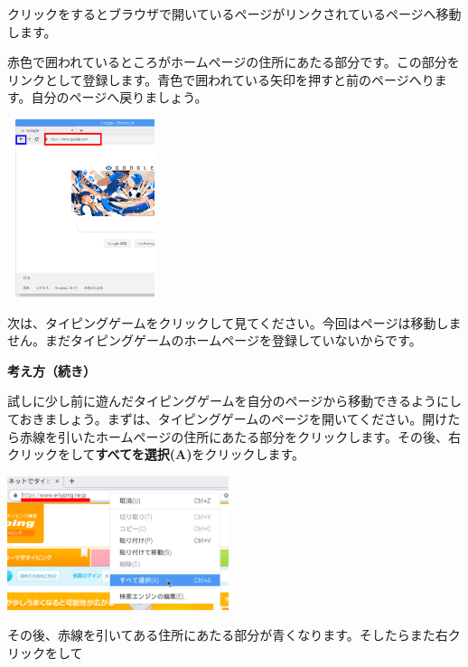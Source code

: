 \documentclass[a4paper,12pt]{jarticle}
\begin{document}
\flushleft

\bigskip

クリックをするとブラウザで開いているページがリンクされているページへ移動します。

赤色で囲われているところがホームページの住所にあたる部分です。この部分をリンクとして登録します。青色で囲われている矢印を押すと前のページへります。自分のページへ戻りましょう。



\bigskip

\centering
\includegraphics[width=4.547cm,height=5.216cm]{textbook-img195.png}

\bigskip

\flushleft
次は、タイピングゲームをクリックして見てください。今回はページは移動しません。まだタイピングゲームのホームページを登録していないからです。


\clearpage
\textbf{考え方（続き）}



試しに少し前に遊んだタイピングゲームを自分のページから移動できるようにしておきましょう。まずは、タイピングゲームのページを開いてください。開けたら赤線を引いたホームページの住所にあたる部分をクリックします。その後、右クリックをして\textbf{すべてを選択(A)}をクリックします。


\bigskip

\centering
\includegraphics[width=6.495cm,height=3.914cm]{textbook-img196.png}

\flushleft

その後、赤線を引いてある住所にあたる部分が青くなります。そしたらまた右クリックをして
\end{document}
